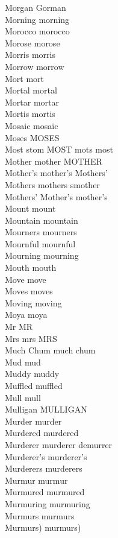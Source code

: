 Morgan Gorman\\
Morning morning\\
Morocco morocco\\
Morose morose\\
Morris morris\\
Morrow morrow\\
Mort mort\\
Mortal mortal\\
Mortar mortar\\
Mortis mortis\\
Mosaic mosaic\\
Moses MOSES\\
Most stom MOST mots most\\
Mother mother MOTHER\\
Mother's mother's Mothers'\\
Mothers mothers smother\\
Mothers' Mother's mother's\\
Mount mount\\
Mountain mountain\\
Mourners mourners\\
Mournful mournful\\
Mourning mourning\\
Mouth mouth\\
Move move\\
Moves moves\\
Moving moving\\
Moya moya\\
Mr MR\\
Mrs mrs MRS\\
Much Chum much chum\\
Mud mud\\
Muddy muddy\\
Muffled muffled\\
Mull mull\\
Mulligan MULLIGAN\\
Murder murder\\
Murdered murdered\\
Murderer murderer demurrer\\
Murderer's murderer's\\
Murderers murderers\\
Murmur murmur\\
Murmured murmured\\
Murmuring murmuring\\
Murmurs murmurs\\
Murmurs) murmurs)\\

